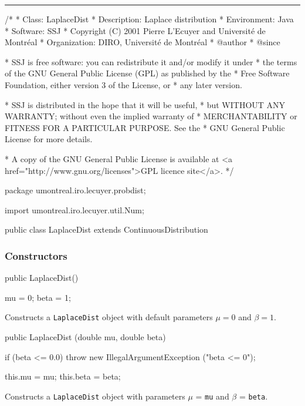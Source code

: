 \bigskip\hrule

\begin{code}
\begin{hide}
/*
 * Class:        LaplaceDist
 * Description:  Laplace distribution
 * Environment:  Java
 * Software:     SSJ 
 * Copyright (C) 2001  Pierre L'Ecuyer and Université de Montréal
 * Organization: DIRO, Université de Montréal
 * @author       
 * @since

 * SSJ is free software: you can redistribute it and/or modify it under
 * the terms of the GNU General Public License (GPL) as published by the
 * Free Software Foundation, either version 3 of the License, or
 * any later version.

 * SSJ is distributed in the hope that it will be useful,
 * but WITHOUT ANY WARRANTY; without even the implied warranty of
 * MERCHANTABILITY or FITNESS FOR A PARTICULAR PURPOSE.  See the
 * GNU General Public License for more details.

 * A copy of the GNU General Public License is available at
   <a href="http://www.gnu.org/licenses">GPL licence site</a>.
 */
\end{hide}
package umontreal.iro.lecuyer.probdist;\begin{hide}

import umontreal.iro.lecuyer.util.Num;\end{hide}

public class LaplaceDist extends ContinuousDistribution\begin{hide} {
   private double mu;
   private double beta;
\end{hide}
\end{code}
\subsubsection* {Constructors}

\begin{code}

   public LaplaceDist()\begin{hide} {
      mu = 0;
      beta = 1;
   }\end{hide}
\end{code}
\begin{tabb} Constructs a \texttt{LaplaceDist} object with default
 parameters $\mu = 0$  and $\beta = 1$.
\end{tabb}
\begin{code}

   public LaplaceDist (double mu, double beta)\begin{hide} {
      if (beta <= 0.0)
         throw new IllegalArgumentException ("beta <= 0");

      this.mu = mu;
      this.beta = beta;
   }\end{hide}
\end{code}
\begin{tabb} Constructs a \texttt{LaplaceDist} object with parameters
 $\mu$ = \texttt{mu} and $\beta$ = \texttt{beta}.
\end{tabb}

